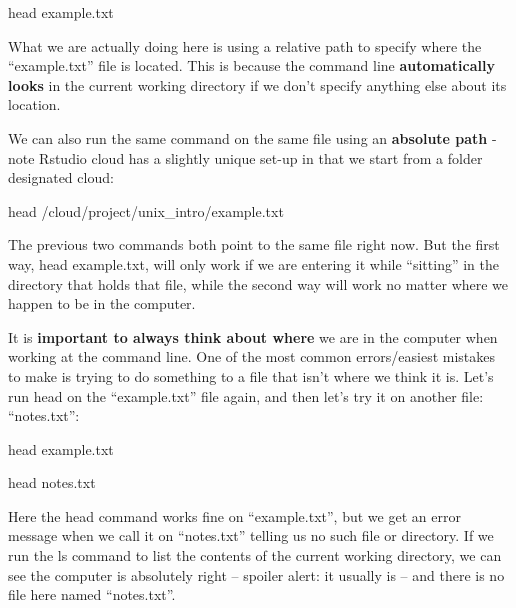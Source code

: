 \documentclass[
]{book}
\newenvironment{Shaded}{\begin{snugshade}}{\end{snugshade}}
\newcommand{\FunctionTok}[1]{\textcolor[rgb]{0.00,0.00,0.00}{#1}}
\newcommand{\NormalTok}[1]{#1}
\begin{document}
\begin{Shaded}
\begin{Highlighting}[]
    \FunctionTok{head}\NormalTok{ example.txt}
\end{Highlighting}
\end{Shaded}

What we are actually doing here is using a relative path to specify where the ``example.txt'' file is located. This is because the command line \textbf{automatically looks} in the current working directory if we don't specify anything else about its location.

We can also run the same command on the same file using an \textbf{absolute path} - note Rstudio cloud has a slightly unique set-up in that we start from a folder designated cloud:

\begin{Shaded}
\begin{Highlighting}[]
    \FunctionTok{head}\NormalTok{ /cloud/project/unix\_intro/example.txt}
\end{Highlighting}
\end{Shaded}

The previous two commands both point to the same file right now. But the first way, head example.txt, will only work if we are entering it while ``sitting'' in the directory that holds that file, while the second way will work no matter where we happen to be in the computer.

It is \textbf{important to always think about where} we are in the computer when working at the command line. One of the most common errors/easiest mistakes to make is trying to do something to a file that isn't where we think it is. Let's run head on the ``example.txt'' file again, and then let's try it on another file: ``notes.txt'':

\begin{Shaded}
\begin{Highlighting}[]
\FunctionTok{head}\NormalTok{ example.txt}
\end{Highlighting}
\end{Shaded}

\begin{Shaded}
\begin{Highlighting}[]
\FunctionTok{head}\NormalTok{ notes.txt}
\end{Highlighting}
\end{Shaded}

Here the head command works fine on ``example.txt'', but we get an error message when we call it on ``notes.txt'' telling us no such file or directory. If we run the ls command to list the contents of the current working directory, we can see the computer is absolutely right -- spoiler alert: it usually is -- and there is no file here named ``notes.txt''.
\end{document}
